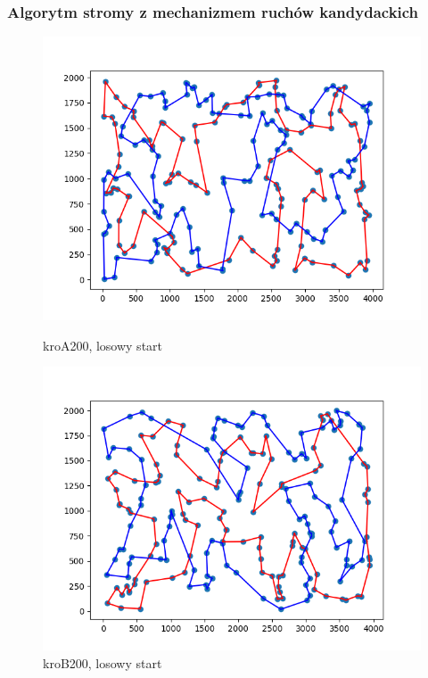 \documentclass[11pt]{article}
\begin{document}
\subsubsection{Algorytm stromy z mechanizmem ruchów kandydackich}\label{subsubsec:algorytm-stromy-z-mechanizmem-ruchow-kandydackich}

\begin{figure}[H]
    \begin{minipage}[t]{0.45\textwidth}
        \centering
        \includegraphics[width=\linewidth]{best_paths/kroA200/steepest_kandydackie}
        \caption{kroA200, losowy start}
    \end{minipage}
    \hfill
    \begin{minipage}[t]{0.45\textwidth}
        \centering
        \includegraphics[width=\linewidth]{best_paths/kroB200/steepest_kandydackie}
        \caption{kroB200, losowy start}
    \end{minipage}\label{fig:figure3}
\end{figure}
\end{document}
